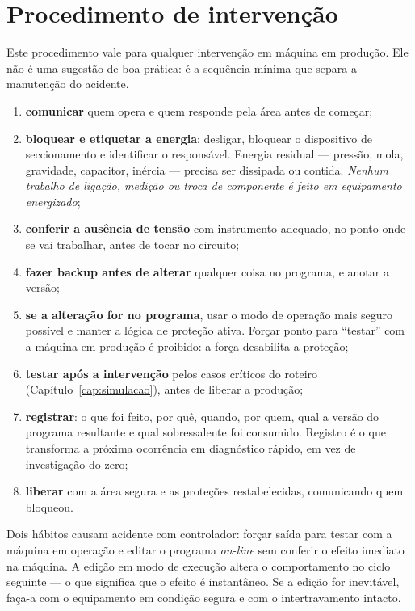 \section{Procedimento de intervenção}

Este procedimento vale para qualquer intervenção em máquina em produção. Ele não é uma sugestão de
boa prática: é a sequência mínima que separa a manutenção do acidente.

\begin{enumerate}
  \item \textbf{comunicar} quem opera e quem responde pela área antes de começar;
  \item \textbf{bloquear e etiquetar a energia}: desligar, bloquear o dispositivo de seccionamento e
        identificar o responsável. Energia residual --- pressão, mola, gravidade, capacitor, inércia
        --- precisa ser dissipada ou contida. \emph{Nenhum trabalho de ligação, medição ou troca de
        componente é feito em equipamento energizado};
  \item \textbf{conferir a ausência de tensão} com instrumento adequado, no ponto onde se vai
        trabalhar, antes de tocar no circuito;
  \item \textbf{fazer backup antes de alterar} qualquer coisa no programa, e anotar a versão;
  \item \textbf{se a alteração for no programa}, usar o modo de operação mais seguro possível e
        manter a lógica de proteção ativa. Forçar ponto para ``testar'' com a máquina em produção é
        proibido: a força desabilita a proteção;
  \item \textbf{testar após a intervenção} pelos casos críticos do roteiro
        (Capítulo~\ref{cap:simulacao}), antes de liberar a produção;
  \item \textbf{registrar}: o que foi feito, por quê, quando, por quem, qual a versão do programa
        resultante e qual sobressalente foi consumido. Registro é o que transforma a próxima
        ocorrência em diagnóstico rápido, em vez de investigação do zero;
  \item \textbf{liberar} com a área segura e as proteções restabelecidas, comunicando quem
        bloqueou.
\end{enumerate}

\begin{atencao}
Dois hábitos causam acidente com controlador: forçar saída para testar com a máquina em operação e
editar o programa \emph{on-line} sem conferir o efeito imediato na máquina. A edição em modo de
execução altera o comportamento no ciclo seguinte --- o que significa que o efeito é instantâneo. Se
a edição for inevitável, faça-a com o equipamento em condição segura e com o intertravamento
intacto.
\end{atencao}

